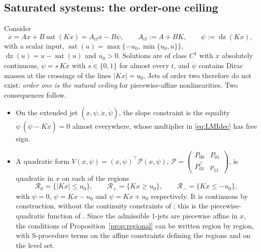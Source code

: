 \documentclass[preprint,12pt,authoryear]{elsarticle}
\theoremstyle{definition}
\theoremstyle{remark}
\newcommand{\tr}{^{\top}}
\newcommand{\PP}{\mathcal{P}}
\newcommand{\dz}{\operatorname{dz}}
\newcommand{\sat}{\operatorname{sat}}
\begin{document}
\subsection{Saturated systems: the order-one ceiling}
Consider
\begin{equation}\label{eq:sat}
\dot x=Ax+B\sat(Kx)=A_{cl}x-B\psi,\qquad A_{cl}:=A+BK,\qquad\psi:=\dz(Kx),
\end{equation}
with a scalar input, $\sat(u)=\max\{-u_0,\min\{u_0,u\}\}$, $\dz(u)=u-\sat(u)$ and $u_0>0$. Solutions are of class $C^1$ with $\dot x$ absolutely continuous, $\dot\psi=s\,K\dot x$ with $s\in\{0,1\}$ for almost every $t$, and $\ddot\psi$ contains Dirac masses at the crossings of the lines $|Kx|=u_0$. Jets of order two therefore do not exist: \emph{order one is the natural ceiling} for piecewise-affine nonlinearities. Two consequences follow.
\begin{itemize}[nosep]
\item On the extended jet $(x,\psi,\dot x,\dot\psi)$, the slope constraint is the equality $\dot\psi\,(\dot\psi-K\dot x)=0$ almost everywhere, whose multiplier in \eqref{eq:LMIdec} has free sign.
\item A quadratic form $V(x,\psi)=(x,\psi)\tr\PP(x,\psi)$, $\PP=\begin{pmatrix}P_{00}&P_{01}\\P_{01}\tr&p_{11}\end{pmatrix}$, is quadratic in $x$ on each of the regions
\begin{equation}\label{eq:regions}
\mathcal R_0=\{|Kx|\le u_0\},\qquad\mathcal R_+=\{Kx\ge u_0\},\qquad\mathcal R_-=\{Kx\le-u_0\},
\end{equation}
with $\psi=0$, $\psi=Kx-u_0$ and $\psi=Kx+u_0$ respectively. It is continuous by construction, without the continuity constraints of \citet{JohanssonRantzer1998}; this is the piecewise-quadratic function of \citet{Dai2009}. Since the admissible $1$-jets are piecewise affine in $x$, the conditions of Proposition~\ref{prop:regional} can be written region by region, with S-procedure terms on the affine constraints defining the regions and on the level set.
\end{itemize}
\end{document}
